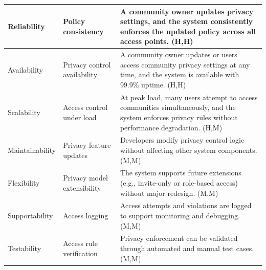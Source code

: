 \documentclass{article}
\begin{document}
\begin{table}[H]
\begin{tabular}{|p{3cm}|p{4cm}|p{7cm}|}
        Reliability
                                   & Policy consistency
                                   & A community owner updates privacy settings, and the system consistently enforces the updated policy across all access points. (H,H)                                         \\
        \hline

        Availability
                                   & Privacy control availability
                                   & A community owner updates or users access community privacy settings at any time, and the system is available with 99.9\% uptime. (H,H)                                     \\
        \hline

        Scalability
                                   & Access control under load
                                   & At peak load, many users attempt to access communities simultaneously, and the system enforces privacy rules without performance degradation. (H,M)                         \\
        \hline

        Maintainability
                                   & Privacy feature updates
                                   & Developers modify privacy control logic without affecting other system components. (M,M)                                                                                    \\
        \hline

        Flexibility
                                   & Privacy model extensibility
                                   & The system supports future extensions (e.g., invite-only or role-based access) without major redesign. (M,M)                                                                \\
        \hline

        Supportability
                                   & Access logging
                                   & Access attempts and violations are logged to support monitoring and debugging. (M,M)                                                                                        \\
        \hline

        Testability
                                   & Access rule verification
                                   & Privacy enforcement can be validated through automated and manual test cases. (M,M)                                                                                         \\
        \hline
    \end{tabular}
\end{table}
\end{document}
